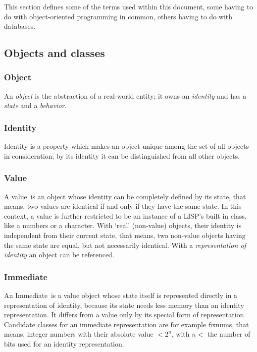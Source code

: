 This section defines some of the terms used within this document, some
having to do with object-oriented programming in common, others having
to do with databases.

\subsection{Objects and classes}%
\label{sec:DefinitionOfObjects}

\subsubsection{Object}

An \emph{object} is the abstraction of a real-world entity; it owns an
\emph{identity} and has a \emph{state} and a \emph{behavior}.

\subsubsection{Identity}

Identity is a property which makes an object unique among the set of
all objects in consideration; by its identity it can be distinguished
from all other objects.

\subsubsection{Value}

A \hypertarget{link:Value}{value}\ is an object whose identity can be
completely defined by its state, that means, two values are identical
if and only if they have the same state. In this context, a value is
further restricted to be an instance of a LISP's built in class, like
a numbers or a character. With `real' (non-value) objects, their
identity is independent from their current state, that means, two
non-value objects having the same state are equal, but not necessarily
identical.  With a \emph{representation of identity} an object can be
referenced.

\subsubsection{Immediate}

An \hypertarget{link:Immediate}{Immediate}\ is a value object whose
state itself is represented directly in a representation of identity,
because its state needs less memory than an identity representation.
It differs from a value only by its special form of representation.
Candidate classes for an immediate representation are for example
fixnums, that means, integer numbers with their absolute value $<
2^{n}$, with $n <$ the number of bits used for an identity
representation.

